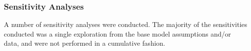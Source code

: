 \documentclass[11pt,
  english,
  a4paper,
]{article}
\begin{document}
\leavevmode\tagmcend\tagstructend\par


\hypertarget{sensitivities}{%
\subsubsection{Sensitivity Analyses}\label{sensitivities}}

\leavevmode\tagmcend\tagstructend


A number of sensitivity analyses were conducted. The majority of the sensitivities conducted was a single exploration from the base model assumptions and/or data, and were not performed in a cumulative fashion.

\leavevmode\tagmcend\tagstructend\par
\end{document}
